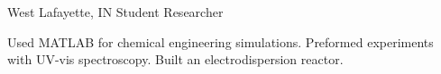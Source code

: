 
        {West Lafayette, IN}
        {Student Researcher}
        {}{
    
    Used MATLAB for chemical engineering simulations. Preformed experiments with UV-vis spectroscopy. Built an electrodispersion reactor. 
    
}
